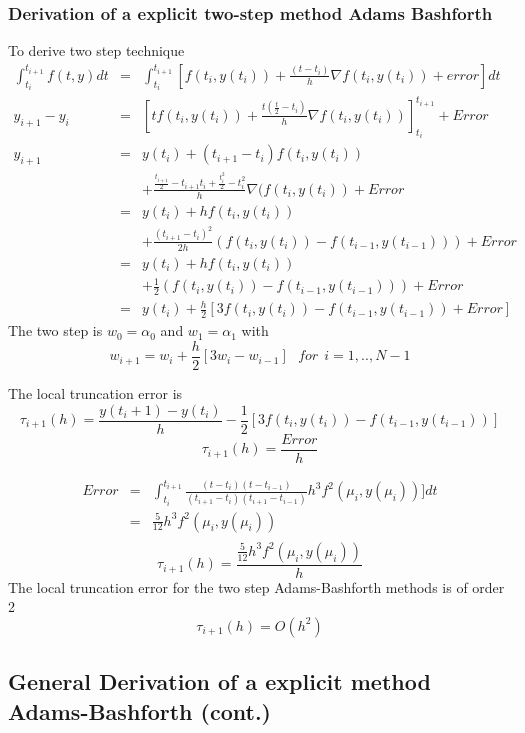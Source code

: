 \subsubsection*{Derivation of a explicit two-step method Adams Bashforth}
To derive two step  technique
\begin{eqnarray*}
\int_{t_i}^{t_{i+1}} f(t,y)dt &= &\int_{t_i}^{t_{i+1}}[f(t_i,y(t_i))+\frac{(t-t_i)}{h}\nabla f(t_i,y(t_i))+error]dt \\
y_{i+1}-y_i &= &[tf(t_i,y(t_i))+\frac{t(\frac{t}{2}-t_i)}{h}\nabla f(t_i,y(t_i))]_{t_i}^{t_{i+1}}+Error \\
y_{i+1}&=&y(t_i)+ (t_{i+1}-t_i)f(t_i,y(t_i))\\
& & +\frac{\frac{t_{i+1}}{2}-t_{i+1}t_i+\frac{t_i^2}{2}-t_i^2}{h}\nabla(f(t_i,y(t_i))+Error\\
&=&y(t_i)+ hf(t_i,y(t_i))\\
& & +\frac{(t_{i+1}-t_i)^2}{2h}(f(t_i,y(t_i))-f(t_{i-1},y(t_{i-1})))+Error\\
&=&y(t_i)+ hf(t_i,y(t_i))\\
& & +\frac{1}{2}(f(t_i,y(t_i))-f(t_{i-1},y(t_{i-1})))+Error\\
&=&y(t_i)+ \frac{h}{2}[3f(t_i,y(t_i))-f(t_{i-1},y(t_{i-1}))+Error]
\end{eqnarray*}
The two step  is $w_0=\alpha_0$ and $w_1=\alpha_1$ with
\[w_{i+1}=w_i+\frac{h}{2}[3w_{i}-w_{i-1}] \ \ \ for \ \ i=1,..,N-1 \]

The local truncation error is
\[\tau_{i+1}(h)=\frac{y(t_i+1)-y(t_i)}{h}-\frac{1}{2}[3f(t_i,y(t_i))-f(t_{i-1},y(t_{i-1})) ]  \]
\[\tau_{i+1}(h)=\frac{Error}{h}\]

\begin{eqnarray*}
Error &= &\int_{t_i}^{t_{i+1}} \frac{(t-t_i)(t-t_{i-1})}{(t_{i+1}-t_i)(t_{i+1}-t_{i-1})}h^3 f^2(\mu_i,y(\mu_i))]dt \\
&=&\frac{5}{12}h^3f^2(\mu_i,y(\mu_i))\\
\end{eqnarray*}
\[\tau_{i+1}(h)=\frac{\frac{5}{12}h^3f^2(\mu_i,y(\mu_i))}{h}\]
The local truncation error for the two step Adams-Bashforth methods is of order 2
\[\tau_{i+1}(h)=O(h^2)\]

\subsection*{General Derivation of a explicit method Adams-Bashforth (cont.)}


